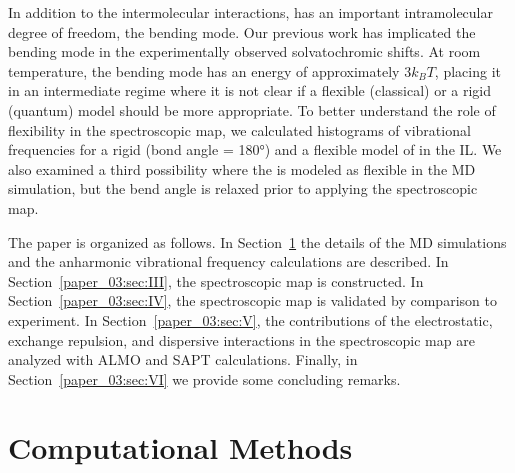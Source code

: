 In addition to the intermolecular interactions,  has an important intramolecular degree of freedom, the bending mode. Our previous work\cite{Brinzer2015} has implicated the bending mode in the experimentally observed solvatochromic shifts. At room temperature, the bending mode has an energy of approximately \(3k_{B}T\), placing it in an intermediate regime where it is not clear if a flexible (classical) or a rigid (quantum) model should be more appropriate. To better understand the role of  flexibility in the spectroscopic map, we calculated histograms of vibrational frequencies for a rigid (bond angle = \ang{180}) and a flexible model of  in the \ce{[C4C1im][PF6]} IL. We also examined a third possibility where the  is modeled as flexible in the MD simulation, but the bend angle is relaxed prior to applying the spectroscopic map.

The paper is organized as follows. In Section~\ref{paper_03:sec:II} the details of the MD simulations and the anharmonic vibrational frequency calculations are described. In Section~\ref{paper_03:sec:III}, the spectroscopic map is constructed. In Section~\ref{paper_03:sec:IV}, the spectroscopic map is validated by comparison to experiment. In Section~\ref{paper_03:sec:V}, the contributions of the electrostatic, exchange repulsion, and dispersive interactions in the spectroscopic map are analyzed with ALMO and SAPT calculations. Finally, in Section~\ref{paper_03:sec:VI} we provide some concluding remarks.

\section{Computational Methods}
\label{paper_03:sec:II}


